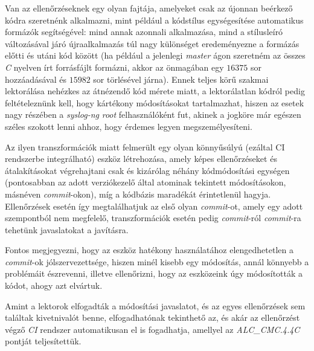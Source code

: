 Van az ellenőrzéseknek egy olyan fajtája, amelyeket csak az újonnan beérkező kódra szeretnénk
alkalmazni, mint például a kódstílus egységesítése automatikus formázók segítségével:
mind annak azonnali alkalmazása, mind a stílusleíró változásával járó újraalkalmazás túl nagy
különséget eredeményezne a formázás előtti és utáni kód között (ha például a jelenlegi \emph{master}
ágon szeretném az összes \emph{C} nyelven írt forrásfájlt formázni, akkor az önmagában egy $16375$
sor hozzáadásával és $15982$ sor törlésével járna). Ennek teljes körű szakmai lektorálása
nehézkes az átnézendő kód mérete miatt, a lektorálatlan kódról pedig feltételeznünk kell, hogy
kártékony módosításokat tartalmazhat, hiszen az esetek nagy részében a \emph{syslog-ng} \emph{root}
felhasználóként fut, akinek a jogköre már egészen széles szokott lenni ahhoz, hogy érdemes legyen
megszemélyesíteni.

Az ilyen transzformációk miatt felmerült egy olyan könnyűsúlyú (ezáltal CI rendszerbe integrálható)
eszköz létrehozása, amely képes ellenőrzéseket és átalakításokat végrehajtani csak és kizárólag
néhány kódmódosítási egységen (pontosabban az adott verziókezelő által atominak tekintett
módosításokon, másnéven \emph{commit}-okon), míg a kódbázis maradékát érintetlenül hagyja.
Ellenőrzések esetén így megtalálhatjuk az első olyan \emph{commit}-ot, amely egy adott szempontból
nem megfelelő, transzformációk esetén pedig \emph{commit}-ról \emph{commit}-ra tehetünk javaslatokat
a javításra.

Fontos megjegyezni, hogy az eszköz hatékony használatához elengedhetetlen a \emph{commit}-ok
jólszervezettsége, hiszen minél kisebb egy módosítás, annál könnyebb a problémáit észrevenni,
illetve ellenőrizni, hogy az eszközeink úgy módosították a kódot, ahogy azt elvártuk.

Amint a lektorok elfogadták a módosítási javaslatot, és az egyes ellenőrzések sem találtak
kivetnivalót benne, elfogadhatónak tekinthető az, és akár az ellenőrzést végző \emph{CI} rendszer
automatikusan el is fogadhatja, amellyel az \emph{ALC\_CMC.4.4C} pontját teljesítettük.

